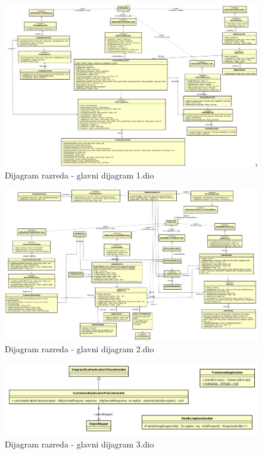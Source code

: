 			\begin{figure}[H]
				\includegraphics[scale=0.5]{dijagrami/glavni_1.png}%
				\centering
				\caption{Dijagram razreda - glavni dijagram 1.dio}
				\label{fig:promjena9.1}
			\end{figure}
			
			\begin{figure}[H]
				\includegraphics[scale=0.5]{dijagrami/glavni_2.png}%
				\centering
				\caption{Dijagram razreda - glavni dijagram 2.dio}
				\label{fig:promjena9.2}
			\end{figure}
			
			\begin{figure}[H]
				\includegraphics[scale=0.5]{dijagrami/glavni_3.png}%
				\centering
				\caption{Dijagram razreda - glavni dijagram 3.dio}
				\label{fig:promjena9.3}
			\end{figure}

